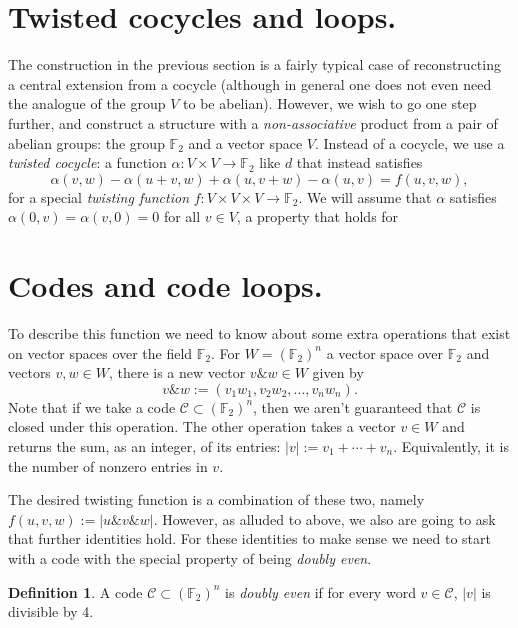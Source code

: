 \documentclass{article}
\theoremstyle{plain}
\theoremstyle{definition}
\newtheorem*{definition}{Definition}
\def \cC {\mathcal{C}}
\def \FF {\mathbb{F}}
\newcommand{\AND}{\mathbin{\texttt{\&}}}
\begin{document}
\section{Twisted cocycles and loops.}

The construction in the previous section is a fairly typical case of reconstructing a central extension from a cocycle (although in general one does not even need the analogue of the group $V$ to be abelian). 
However, we wish to go one step further, and construct a structure with a \emph{non-associative} product from a pair of abelian groups: the group $\FF_2$ and a vector space $V$.
Instead of a cocycle, we use a \emph{twisted cocycle}: a function $\alpha\colon V\times V \to \FF_2$ like $d$ that instead satisfies
\[
	\alpha(v,w)-\alpha(u+v,w)+\alpha(u,v+w)-\alpha(u,v) = f(u,v,w),
\]
for a special \emph{twisting function} $f\colon V\times V\times V \to \FF_2$. We will assume that $\alpha$ satisfies $\alpha(0,v)=\alpha(v,0) = 0$ for all $v\in V$, a property that holds for 





\section{Codes and code loops.}

To describe this function we need to know about some extra operations that exist on vector spaces over the field $\FF_2$. 
For $W=(\FF_2)^n$ a vector space over $\FF_2$ and vectors $v,w\in W$, there is a new vector $v\AND w \in W$ given by
\[
	v\AND w := (v_1w_1,v_2w_2,\ldots,v_nw_n).
\]
Note that if we take a code $\cC \subset (\FF_2)^n$, then we aren't guaranteed that $\cC$ is closed under this operation.
The other operation takes a vector $v\in W$ and returns the sum, as an integer, of its entries: $|v| := v_1 + \cdots + v_n$. Equivalently, it is the number of nonzero entries in $v$.

The desired twisting function is a combination of these two, namely $f(u,v,w) := |u\AND v\AND w|$.
However, as alluded to above, we also are going to ask that further identities hold. 
For these identities to make sense we need to start with a code with the special property of being \emph{doubly even}.

\begin{definition}
A code $\cC \subset (\FF_2)^n$ is \emph{doubly even} if for every word $v\in \cC$, $|v|$ is divisible by 4. 
\end{definition}
\end{document}

